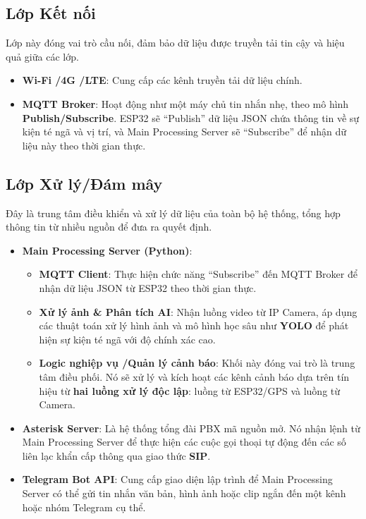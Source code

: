 \subsection{Lớp Kết nối}
Lớp này đóng vai trò cầu nối, đảm bảo dữ liệu được truyền tải tin cậy và hiệu quả giữa các lớp.
\begin{itemize}
    \item \textbf{Wi-Fi \slash 4G \slash LTE}: Cung cấp các kênh truyền tải dữ liệu chính.
    \item \textbf{MQTT Broker}: Hoạt động như một máy chủ tin nhắn nhẹ, theo mô hình \textbf{Publish\slash Subscribe}. ESP32 sẽ ``Publish'' dữ liệu JSON chứa thông tin về sự kiện té ngã và vị trí, và Main Processing Server sẽ ``Subscribe'' để nhận dữ liệu này theo thời gian thực.
\end{itemize}

\subsection{Lớp Xử lý\slash Đám mây}
Đây là trung tâm điều khiển và xử lý dữ liệu của toàn bộ hệ thống, tổng hợp thông tin từ nhiều nguồn để đưa ra quyết định.
\begin{itemize}
    \item \textbf{Main Processing Server (Python)}:
    \begin{itemize}
        \item \textbf{MQTT Client}: Thực hiện chức năng ``Subscribe'' đến MQTT Broker để nhận dữ liệu JSON từ ESP32 theo thời gian thực.
        \item \textbf{Xử lý ảnh \& Phân tích AI}: Nhận luồng video từ IP Camera, áp dụng các thuật toán xử lý hình ảnh và mô hình học sâu như \textbf{YOLO} để phát hiện sự kiện té ngã với độ chính xác cao.
        \item \textbf{Logic nghiệp vụ \slash Quản lý cảnh báo}: Khối này đóng vai trò là trung tâm điều phối. Nó sẽ xử lý và kích hoạt các kênh cảnh báo dựa trên tín hiệu từ \textbf{hai luồng xử lý độc lập}: luồng từ ESP32\slash GPS và luồng từ Camera.
    \end{itemize}
    \item \textbf{Asterisk Server}: Là hệ thống tổng đài PBX mã nguồn mở. Nó nhận lệnh từ Main Processing Server để thực hiện các cuộc gọi thoại tự động đến các số liên lạc khẩn cấp thông qua giao thức \textbf{SIP}.
    \item \textbf{Telegram Bot API}: Cung cấp giao diện lập trình để Main Processing Server có thể gửi tin nhắn văn bản, hình ảnh hoặc clip ngắn đến một kênh hoặc nhóm Telegram cụ thể.
\end{itemize}

